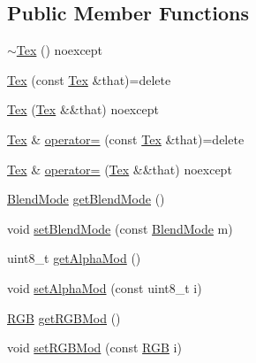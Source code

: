 \subsection*{Public Member Functions}
\begin{DoxyCompactItemize}
\item 
\mbox{\hyperlink{classrolmodl_1_1texture_type_1_1_tex_a8a50a0d7fccc6c92a10cdf620eb24239}{$\sim$\+Tex}} () noexcept
\item 
\mbox{\hyperlink{classrolmodl_1_1texture_type_1_1_tex_afa6e2fccc0213e8baea7925e5d3e23f9}{Tex}} (const \mbox{\hyperlink{classrolmodl_1_1texture_type_1_1_tex}{Tex}} \&that)=delete
\item 
\mbox{\hyperlink{classrolmodl_1_1texture_type_1_1_tex_a3ea3d935893d9e6201ceb95e8661d6a8}{Tex}} (\mbox{\hyperlink{classrolmodl_1_1texture_type_1_1_tex}{Tex}} \&\&that) noexcept
\item 
\mbox{\hyperlink{classrolmodl_1_1texture_type_1_1_tex}{Tex}} \& \mbox{\hyperlink{classrolmodl_1_1texture_type_1_1_tex_a6ef09877eb963104ec08eb30146e09c6}{operator=}} (const \mbox{\hyperlink{classrolmodl_1_1texture_type_1_1_tex}{Tex}} \&that)=delete
\item 
\mbox{\hyperlink{classrolmodl_1_1texture_type_1_1_tex}{Tex}} \& \mbox{\hyperlink{classrolmodl_1_1texture_type_1_1_tex_a59f81e276beb53804578f59863c47c34}{operator=}} (\mbox{\hyperlink{classrolmodl_1_1texture_type_1_1_tex}{Tex}} \&\&that) noexcept
\item 
\mbox{\hyperlink{namespacerolmodl_a642c095a75ddf840ce3484384ee5c822}{Blend\+Mode}} \mbox{\hyperlink{classrolmodl_1_1texture_type_1_1_tex_ac802baa56b224d4f63abf06fcca48a68}{get\+Blend\+Mode}} ()
\item 
void \mbox{\hyperlink{classrolmodl_1_1texture_type_1_1_tex_ae473384d3fcf3a2e69ea92b06da370e6}{set\+Blend\+Mode}} (const \mbox{\hyperlink{namespacerolmodl_a642c095a75ddf840ce3484384ee5c822}{Blend\+Mode}} m)
\item 
uint8\+\_\+t \mbox{\hyperlink{classrolmodl_1_1texture_type_1_1_tex_a686ce84889b72fa6829cdafb6ab805f1}{get\+Alpha\+Mod}} ()
\item 
void \mbox{\hyperlink{classrolmodl_1_1texture_type_1_1_tex_ad44a0fb4ef7d40897962511ac85d7367}{set\+Alpha\+Mod}} (const uint8\+\_\+t i)
\item 
\mbox{\hyperlink{structrolmodl_1_1_r_g_b}{R\+GB}} \mbox{\hyperlink{classrolmodl_1_1texture_type_1_1_tex_a4504afa036e8b8f342a7a1c12b3c33ea}{get\+R\+G\+B\+Mod}} ()
\item 
void \mbox{\hyperlink{classrolmodl_1_1texture_type_1_1_tex_a0087a2b7605b558ed65a7c5a629c8563}{set\+R\+G\+B\+Mod}} (const \mbox{\hyperlink{structrolmodl_1_1_r_g_b}{R\+GB}} i)

\end{DoxyCompactItemize}
